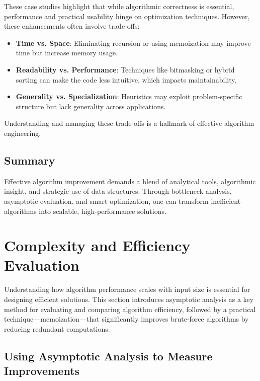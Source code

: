 \documentclass[12pt]{article}
\begin{document}
These case studies highlight that while algorithmic correctness is essential, performance and practical usability hinge on optimization techniques. However, these enhancements often involve trade-offs:

\begin{itemize}
    \item \textbf{Time vs. Space}: Eliminating recursion or using memoization may improve time but increase memory usage.
    \item \textbf{Readability vs. Performance}: Techniques like bitmasking or hybrid sorting can make the code less intuitive, which impacts maintainability.
    \item \textbf{Generality vs. Specialization}: Heuristics may exploit problem-specific structure but lack generality across applications.
\end{itemize}

Understanding and managing these trade-offs is a hallmark of effective algorithm engineering.

\subsection*{Summary}

Effective algorithm improvement demands a blend of analytical tools, algorithmic insight, and strategic use of data structures. Through bottleneck analysis, asymptotic evaluation, and smart optimization, one can transform inefficient algorithms into scalable, high-performance solutions.



\section{Complexity and Efficiency Evaluation}

Understanding how algorithm performance scales with input size is essential for designing efficient solutions. This section introduces asymptotic analysis as a key method for evaluating and comparing algorithm efficiency, followed by a practical technique—memoization—that significantly improves brute-force algorithms by reducing redundant computations.

\subsection{Using Asymptotic Analysis to Measure Improvements}
\end{document}
